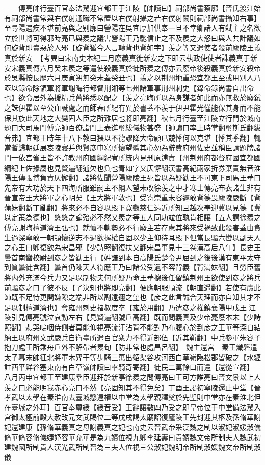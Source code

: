 　　傅亮帥行臺百官奉法駕迎宜都王于江陵【帥讀曰】祠部尚書蔡廓【晉氏渡江始有祠部尚書常與右僕射通職不常置以右僕射攝之若右僕射闕則祠部尚書攝知右事】至尋陽遇疾不堪前亮與之别廓曰營陽在吳宜厚加供奉一旦不幸卿諸人有弑主之名欲立於世將可得邪時亮已與羨之議害營陽王乃馳信止之不及羨之大怒曰與人共計議如何旋背即賣惡於人邪【旋背猶今人言轉背也背如字】羨之等又遣使者殺前廬陵王義真於新安　【考異曰宋南史本紀二月廢義真徙新安之下即云執政使使者誅義真于新安宋義真傳六月癸未羨之等遣使殺義真於徙所羨之傳亦云廢帝後殺義真於新安殺帝於吳縣按長歷六月庚寅朔無癸未蓋癸丑也】羨之以荆州地重恐宜都王至或用别人乃亟以錄命除領軍將軍謝晦行都督荆湘等七州諸軍事荆州刺史【錄命錄尚書自出命也】欲令居外為援精兵舊將悉以配之【羨之亮晦所以為身謀者如此而亦無救於廢弑之誅伊霍以至公血誠處之而師春所紀有異於書蓋不羨于伊尹霍光僅能保其身而不能保其族此天地之大變固人臣之所難居也將即亮翻】秋七月行臺至江陵立行門於城南題曰大司馬門傅亮帥百僚詣門上表進璽紱儀物甚盛【帥讀曰率上時掌翻璽斯氏翻紱音弗】宜都王時年十八下教曰猥以不德謬降大命顧已兢悸何以克堪【悸其季翻】輒當暫歸朝廷展哀陵寢并與賢彦申寫所懷望體其心勿為辭費府州佐史並稱臣請題牓諸門一依宫省王皆不許教州府國綱紀宥所統内見刑原逋責【州荆州府都督府國宜都國綱紀上佐掾屬也見賢遍翻逋欠也負也青如字又仄懈翻漢書高紀兩家折券棄責無音淮陽王傳張博負責仄懈翻】諸將佐聞營陽廬陵王死皆以為疑勸王不可東下司馬王華曰先帝有大功於天下四海所服雖嗣主不綱人望未改徐羨之中才寒士傳亮布衣諸生非有晉宣帝王大將軍之心明矣【王大將軍敦也】受寄崇重未容遽敢背德畏廬陵嚴斷【背蒲妹翻斷丁亂翻】將來必不自容以殿下寛叡慈仁遠近所知且越次奉迎冀以見德【冀以定策為德也】悠悠之論殆必不然又羨之等五人同功竝位孰肯相讓【五人謂徐羨之傅亮謝晦檀道濟王弘也】就懷不軌勢必不行廢主若存慮其將來受禍致此殺害蓋由貪生過深寧敢一朝頓懷逆志不過欲握權自固以少主仰待耳殿下但當長驅六轡以副天人之心王曰卿復欲為宋昌邪【少詩照翻復扶又翻宋昌事見十三卷漢高后八年】長史王曇首南蠻校尉到彦之皆勸王行【姓譜到本自高陽氏楚令尹屈到之後後漢有東平太守到質曇徒含翻】曇首仍陳天人符應王乃曰諸公受遺不容背義【背滿妹翻】且勞臣舊將内外充滿今兵力又足以制物夫何所疑乃命王華摠後任留鎮荆州王欲使到彦之將兵前驅彦之曰了彼不反【了決知也將即亮翻】便應朝服順流【朝直遥翻】若使有虞此師既不足恃更開嫌隙之端非所以副遠邇之望也【彦之此言誠合天理而亦自知其才不足以制檀道濟也】會雍州刺史褚叔度卒【雍於用翻】乃遣彦之權鎮襄陽甲戌王江陵引見傅亮號泣哀動左右【見賢遍翻號戶高翻】既而問義真及少帝薨廢本末【少詩照翻】悲哭嗚咽侍側者莫能仰視亮流汗沾背不能對乃布腹心於到彦之王華等深自結納王以府州文武嚴兵自衛臺所遣百官衆力不得近部伍【近其靳翻】中兵參軍朱容子抱刀處王所乘舟戶外不解帶者累旬【防非常也處昌呂翻】　魏主還宫　秦王熾磐遣太子暮末帥征北將軍木弈干等步騎三萬出貂渠谷攻河西白草嶺臨松郡皆破之【水經註西平鮮谷塞東南有白草嶺帥讀曰率騎奇寄翻】徙民二萬餘口而還【還從宣翻】　八月丙申宜都王至建康羣臣迎拜於新亭徐羨之問傅亮曰王可方誰亮曰晉文景以上人羨之曰必能明我赤心亮曰不然【亮固知其不得免矣】丁酉王謁初寧陵還止中堂【晉孝武以太學在秦淮南去臺城懸遠權以中堂為太學親釋奠於先聖則中堂亦在秦淮北但在臺城之外耳】百官奉璽綬【綬音受】王辭讓數四乃受之即皇帝位于中堂備法駕入宫御太極前殿大赦改元文武賜位二等戊戌謁太廟詔復廬陵王先封迎其柩及孫脩華謝妃還建康【孫脩華義真之母謝義真之妃也南史云晉武帝采漢魏之制以淑妃淑媛淑儀脩華脩容脩儀婕妤容華充華是為九嬪位視九卿李延夀曰貴嬪魏文帝所制夫人魏武初建魏國所制貴人漢光武所制晉為三夫人位視三公淑妃魏明帝所制淑媛魏文帝所制淑儀